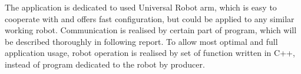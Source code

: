 The application is dedicated to used Universal Robot arm, which is easy to cooperate with and offers fast configuration, but could be applied to any similar working robot. Communication is realised by certain part of program, which will be described thoroughly in following report. To allow most optimal and full application usage, robot operation is realised by set of function written in C++, instead of program dedicated to the robot by producer. 

